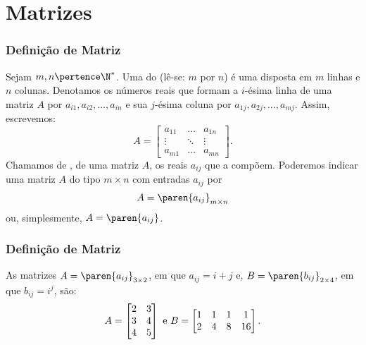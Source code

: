 \section{Matrizes}


\begin{frame}
    \frametitle{Definição de Matriz}
    
    \begin{definicao}
        Sejam $m, n \pertence \N^\ast$. Uma  do  (lê-se: $m$ por $n$) é uma  disposta em $m$ linhas e $n$ colunas. Denotamos os números reais que formam a $i$-ésima linha de uma matriz $A$ por $a_{i1}, a_{i2}, \dots , a_{in}$ e sua $j$-ésima coluna por $a_{1j}, a_{2j}, \dots , a_{mj}$. Assim, escrevemos:
        \begin{displaymath} A = 
            \begin{bmatrix}
                a_{11} & \dots & a_{1n} \\
                \vdots & \ddots & \vdots \\
                a_{m1} & \dots & a_{mn}
            \end{bmatrix}.
        \end{displaymath}
        Chamamos de , de uma matriz $A$, os reais $a_{ij}$ que a compõem.
        Poderemos indicar uma matriz $A$ do tipo $m \times n$ com entradas $a_{ij}$ por
        $$ A = \paren{a_{ij}}_{m \times n}$$
        ou, simplesmente, $A = \paren{a_{ij}}$.
    \end{definicao}
\end{frame}


\begin{frame}
    \frametitle{Definição de Matriz}

    \begin{exemplo}
        As matrizes $A = \paren{a_{ij}}_{3 \times 2}$, em que $a_{ij}=i+j$ e, $B = \paren{b_{ij}}_{ 2 \times 4}$, em que $b_{ij} = i^j$, são:
        \begin{displaymath} A = 
            \begin{bmatrix}
                2 & 3 \\
                3 & 4 \\
                4 & 5
            \end{bmatrix}
            \space \text{ e } \space B=
            \begin{bmatrix}
                1 & 1 & 1 & 1 \\
                2 & 4 & 8 & 16
            \end{bmatrix}.
        \end{displaymath}
    \end{exemplo}

\end{frame}

